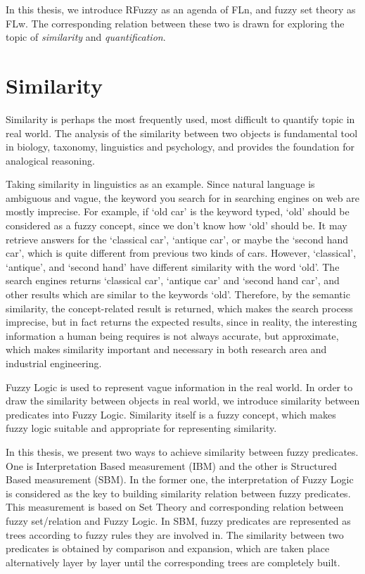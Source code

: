 \documentclass[Thesis.tex]{subfiles}
\begin{document}
In this thesis, we introduce RFuzzy as an agenda of FLn, and fuzzy set theory as FLw. The corresponding relation between these two is drawn for exploring the topic of \textit{similarity} and \textit{quantification}.
 
\section{Similarity}
Similarity is perhaps the most frequently used, most difficult to quantify topic in real world. The analysis of the similarity between two objects is fundamental tool in biology, taxonomy, linguistics and psychology, and provides the foundation for analogical reasoning. 

Taking similarity in linguistics as an example. Since natural language is ambiguous and vague, the keyword you search for in searching engines on web are mostly imprecise. For example, if `old car' is the keyword typed, `old' should be considered as a fuzzy concept, since we don't know how `old' should be. It may retrieve answers for the `classical car', `antique car', or maybe the `second hand car', which is quite different from previous two kinds of cars. However, `classical', `antique', and `second hand' have different similarity with the word `old'. The search engines returns `classical car', `antique car' and `second hand car', and other results which are similar to the keywords `old'. Therefore, by the semantic similarity, the concept-related result is returned, which makes the search process imprecise, but in fact returns the expected results, since in reality, the interesting information a human being requires is not always accurate, but approximate, which makes similarity important and necessary in both research area and industrial engineering. 

Fuzzy Logic is used to represent vague information in the real world. In order to draw the similarity between objects in real world, we introduce similarity between predicates into Fuzzy Logic. Similarity itself is a fuzzy concept, which makes fuzzy logic suitable and appropriate for representing similarity. 

In this thesis, we present two ways to achieve similarity between fuzzy predicates. One is Interpretation Based measurement (IBM) and the other is Structured Based measurement (SBM). In the former one,  the interpretation of Fuzzy Logic is considered as the key to building similarity relation between fuzzy predicates. This measurement is based on Set Theory and corresponding relation between fuzzy set/relation and Fuzzy Logic. In SBM, fuzzy predicates are represented as trees according to fuzzy rules they are involved in. The similarity between two predicates is obtained by comparison and expansion, which are taken place alternatively layer by layer until the corresponding trees are completely built. 
\end{document}
